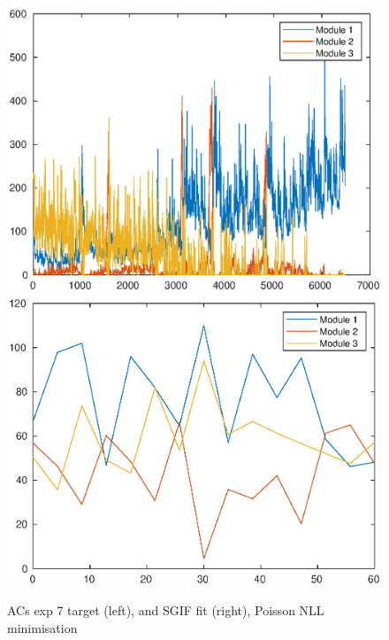\documentclass[mphil,deptreport,ianc]{infthesis} %
\begin{document}
\begin{figure}
    \centering
    \includegraphics[width=0.49\columnwidth]{figures/sleep/ACs147.eps}
    \includegraphics[width=0.49\columnwidth]{figures/sleep/ACs_nuovo_sleep_v2_spikes_mt_microGIF_euid_12-29_02-12-29-631_exp_6_lfn_poisson_nll.eps}
    \caption{ACs exp 7 target (left), and SGIF fit (right), Poisson NLL minimisation}
    \label{fig:ACs_exp7}
\end{figure}
\end{document}
